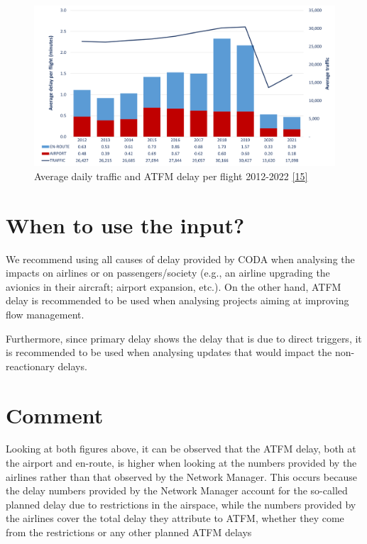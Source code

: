 \documentclass[
  11pt,
  a4paper,
]{book}
\begin{document}
\begin{figure}

{\centering \includegraphics{./figures/atfm_delay.png}

}

\caption{\label{fig-atfm-delay}Average daily traffic and ATFM delay per
flight 2012-2022 \protect\hyperlink{ref-nm2022}{{[}15{]}}}

\end{figure}

\hypertarget{when-to-use-the-input-1}{%
\section{When to use the input?}\label{when-to-use-the-input-1}}

We recommend using all causes of delay provided by CODA when analysing
the impacts on airlines or on passengers/society (e.g., an airline
upgrading the avionics in their aircraft; airport expansion, etc.). On
the other hand, ATFM delay is recommended to be used when analysing
projects aiming at improving flow management.

Furthermore, since primary delay shows the delay that is due to direct
triggers, it is recommended to be used when analysing updates that would
impact the non-reactionary delays.

\hypertarget{comment}{%
\section{Comment}\label{comment}}

Looking at both figures above, it can be observed that the ATFM delay,
both at the airport and en-route, is higher when looking at the numbers
provided by the airlines rather than that observed by the Network
Manager. This occurs because the delay numbers provided by the Network
Manager account for the so-called planned delay due to restrictions in
the airspace, while the numbers provided by the airlines cover the total
delay they attribute to ATFM, whether they come from the restrictions or
any other planned ATFM delays
\end{document}
